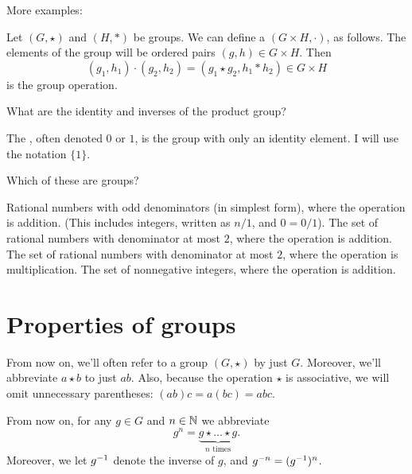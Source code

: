 More examples:
\begin{example}
	Let $(G, \star)$ and $(H, \ast)$ be groups.
	We can define a  $(G \times H, {\cdot})$, as follows.
	The elements of the group will be ordered pairs $(g,h) \in G \times H$.
	Then
	\[ (g_1, h_1) \cdot (g_2, h_2) = (g_1 \star g_2, h_1 \ast h_2) \in G \times H
		\]
	is the group operation.
	\label{def:product_group}
\end{example}
\begin{ques}
	What are the identity and inverses of the product group?
\end{ques}

\begin{example}
	The , often denoted $0$ or $1$,
	is the group with only an identity element.
	I will use the notation $\{1\}$.
\end{example}

\begin{exercise}
	Which of these are groups?
	\begin{enumerate}[(a)]
		\ii Rational numbers with odd denominators (in simplest form), where the operation is addition.
		(This includes integers, written as $n/1$, and $0 = 0/1$).
		\ii The set of rational numbers with denominator at most $2$, where the operation is addition.
		\ii The set of rational numbers with denominator at most $2$, where the operation is multiplication.
		\ii The set of nonnegative integers, where the operation is addition.
	\end{enumerate}
\end{exercise}


\section{Properties of groups}
\begin{abuse}
	From now on, we'll often refer to a group $(G, \star)$ by just $G$.
	Moreover, we'll abbreviate $a \star b$ to just $ab$.
	Also, because the operation $\star$ is associative,
	we will omit unnecessary parentheses: $(ab)c = a(bc) = abc$.
\end{abuse}
\begin{abuse}
	From now on, for any $g \in G$ and $n \in \mathbb N$ we abbreviate
	\[ g^n
		=
		\underbrace{g \star \dots \star g}_{\text{$n$ times}}.\]
	Moreover, we let $g^{-1}$ denote the inverse of $g$,
	and $g^{-n} = (g^{-1})^n$.
\end{abuse}

